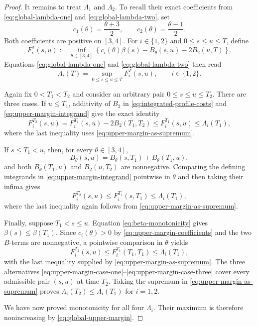 \documentclass[11pt]{article}
\numberwithin{equation}{section}
\newcommand{\1}{\mathbf 1}
\begin{document}
\begin{proof}
It remains to treat $\Lambda_1$ and $\Lambda_2$.  To recall their exact
coefficients from \eqref{eq:global-lambda-one} and
\eqref{eq:global-lambda-two}, set
\begin{equation}
\label{eq:upper-margin-coefficients}
  c_1(\theta)=\frac{\theta+3}{2},
  \qquad
  c_2(\theta)=\frac{\theta-1}{2}.
\end{equation}
Both coefficients are positive on $[3,4]$.  For $i\in\{1,2\}$ and
$0\le s\le u\le T$, define
\begin{equation}
\label{eq:upper-margin-integrand}
  F_i^T(s,u)
  :=\inf_{\theta\in[3,4]}
  \left\{c_i(\theta)\beta(s)-B_\theta(s,u)-2B_2(u,T)\right\}.
\end{equation}
Equations \eqref{eq:global-lambda-one} and
\eqref{eq:global-lambda-two} then read
\begin{equation}
\label{eq:upper-margin-as-supremum}
  \Lambda_i(T)=\sup_{0\le s\le u\le T}F_i^T(s,u),
  \qquad i\in\{1,2\}.
\end{equation}

Again fix $0<T_1<T_2$ and consider an arbitrary pair
$0\le s\le u\le T_2$.  There are three cases.  If $u\le T_1$, additivity
of $B_2$ in \eqref{eq:integrated-profile-costs} and
\eqref{eq:upper-margin-integrand} give the exact identity
\begin{equation}
\label{eq:upper-margin-case-one}
  F_i^{T_2}(s,u)
  =F_i^{T_1}(s,u)-2B_2(T_1,T_2)
  \le F_i^{T_1}(s,u)
  \le\Lambda_i(T_1),
\end{equation}
where the last inequality uses \eqref{eq:upper-margin-as-supremum}.

If $s\le T_1<u$, then, for every $\theta\in[3,4]$,
\[
  B_\theta(s,u)=B_\theta(s,T_1)+B_\theta(T_1,u),
\]
and both $B_\theta(T_1,u)$ and $B_2(u,T_2)$ are nonnegative.  Comparing
the defining integrands in \eqref{eq:upper-margin-integrand} pointwise in
$\theta$ and then taking their infima gives
\begin{equation}
\label{eq:upper-margin-case-two}
  F_i^{T_2}(s,u)
  \le F_i^{T_1}(s,T_1)
  \le\Lambda_i(T_1),
\end{equation}
where the last inequality again follows from
\eqref{eq:upper-margin-as-supremum}.

Finally, suppose $T_1<s\le u$.  Equation \eqref{eq:beta-monotonicity} gives
$\beta(s)\le\beta(T_1)$.  Since $c_i(\theta)>0$ by
\eqref{eq:upper-margin-coefficients} and the two $B$-terms are
nonnegative, a pointwise comparison in $\theta$ yields
\begin{equation}
\label{eq:upper-margin-case-three}
  F_i^{T_2}(s,u)
  \le F_i^{T_1}(T_1,T_1)
  \le\Lambda_i(T_1),
\end{equation}
with the last inequality supplied by
\eqref{eq:upper-margin-as-supremum}.  The three alternatives
\eqref{eq:upper-margin-case-one}--\eqref{eq:upper-margin-case-three} cover
every admissible pair $(s,u)$ at time $T_2$.  Taking the supremum in
\eqref{eq:upper-margin-as-supremum} proves
$\Lambda_i(T_2)\le\Lambda_i(T_1)$ for $i=1,2$.

We have now proved monotonicity for all four $\Lambda_i$.  Their maximum is
therefore nonincreasing by \eqref{eq:global-upper-margin}.
\end{proof}
\end{document}
